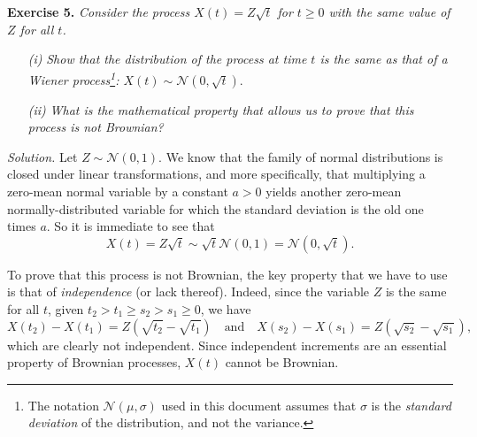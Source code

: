 
\textbf{Exercise 5. }\emph{Consider the process \( X(t) = Z\sqrt{t} \) for \( t \geq 0 \) with the same value of \( Z \) for all \( t \).}
\begin{enumerate}
  \item[\textit{(i)}] \emph{Show that the distribution of the process at time \( t \) is the same as that of a Wiener process\footnote{The notation $\mathcal N(\mu, \sigma)$ used in this document assumes that $\sigma$ is the \textit{standard deviation} of the distribution, and not the variance.}: \( X(t) \sim \mathcal{N}(0, \sqrt{t}) \)}.
  \item[\textit{(ii)}] \emph{What is the mathematical property that allows us to prove that this process is not Brownian?}
\end{enumerate}

\emph{Solution.} Let \( Z \sim \mathcal{N}(0, 1) \). We know that the family of normal distributions is closed under linear transformations, and more specifically, that multiplying a zero-mean normal variable by a constant $a>0$ yields another zero-mean normally-distributed variable for which the standard deviation is the old one times $a$. So it is immediate to see that
\[
X(t) = Z \sqrt{t} \sim \sqrt{t}\mathcal{N}(0, 1) = \mathcal{N}(0, \sqrt t).\]

To prove that this process is not Brownian, the key property that we have to use is that of \textit{independence} (or lack thereof). Indeed, since the variable $Z$ is the same for all $t$, given $t_2>t_1\geq s_2> s_1\geq 0$, we have
\[
X(t_2) - X(t_1) = Z(\sqrt{t_2} - \sqrt{t_1}) \quad \text{and} \quad X(s_2) - X(s_1) = Z(\sqrt{s_2} - \sqrt{s_1}),
\]
which are clearly not independent. Since independent increments are an essential property of Brownian processes, $X(t)$ cannot be Brownian.
